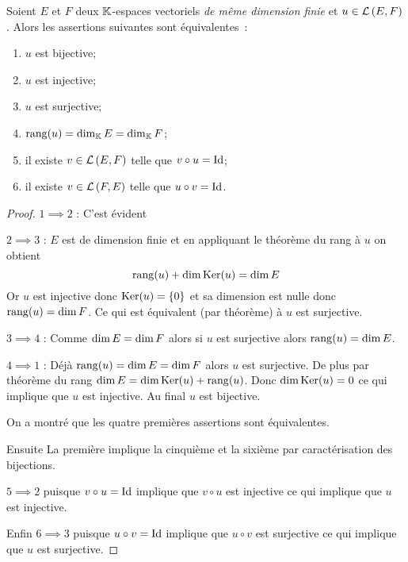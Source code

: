 \begin{theo}
  Soient \(E\) et \(F\) deux \(\mathbb{K}\)-espaces vectoriels \emph{de même dimension 
  finie} et \(u \in \mathcal{L}\left(E,F\right)\). Alors les assertions suivantes sont 
  équivalentes~:
  \begin{enumerate}
    \item \(u\) est bijective;
    \item \(u\) est injective;
    \item \(u\) est surjective;
    \item \(\operatorname{rang}(u) = \operatorname{dim}_{\mathbb{K}} E = \operatorname{dim}_{\mathbb{K}} F\);
    \item il existe \(v \in \mathcal{L}\left(E,F\right)\) telle que \(v \circ u = \operatorname{Id}\);
    \item il existe \(v \in \mathcal{L}\left(F,E\right)\) telle que \(u \circ v = \operatorname{Id}\).
  \end{enumerate}
\end{theo}
\begin{proof}
  \(1 \implies 2\) : C'est évident

  \(2 \implies 3\) : \(E\) est de dimension finie et en appliquant le théorème 
  du rang à \(u\) on obtient
  \begin{equation}
    \operatorname{rang}(u) + \operatorname{dim} \operatorname{Ker}(u) = \operatorname{dim} E
  \end{equation}
  Or \(u\) est injective donc \(\operatorname{Ker}(u)=\{0\}\) et sa dimension est nulle donc 
  \(\operatorname{rang}(u) = \operatorname{dim} F\). Ce qui est équivalent (par théorème) à \(u\) est 
  surjective.

  \(3 \implies 4\) : Comme \(\operatorname{dim} E = \operatorname{dim} F\) alors si \(u\) est surjective 
  alors \(\operatorname{rang}(u) = \operatorname{dim} E\).

  \(4 \implies 1\) : Déjà \(\operatorname{rang}(u) = \operatorname{dim} E = \operatorname{dim} F\) alors \(u\) est 
  surjective. De plus par théorème du rang \(\operatorname{dim} E = \operatorname{dim} \operatorname{Ker}(u) + \operatorname{rang}(u)\). 
  Donc \(\operatorname{dim} \operatorname{Ker}(u)=0\) ce qui implique que \(u\) est injective. Au final 
  \(u\) est bijective.

  On a montré que les quatre premières assertions sont équivalentes. 

  Ensuite La première implique la cinquième et la sixième par caractérisation 
  des bijections. 

  \(5 \implies 2\) puisque \(v \circ u = \operatorname{Id} \) implique que \(v \circ u\) est 
  injective ce qui implique que \(u\) est injective. 

  Enfin \(6 \implies 3\) puisque \(u \circ v=\operatorname{Id}\) implique que \(u\circ v\) est 
  surjective ce qui implique que \(u\) est surjective.
\end{proof}

